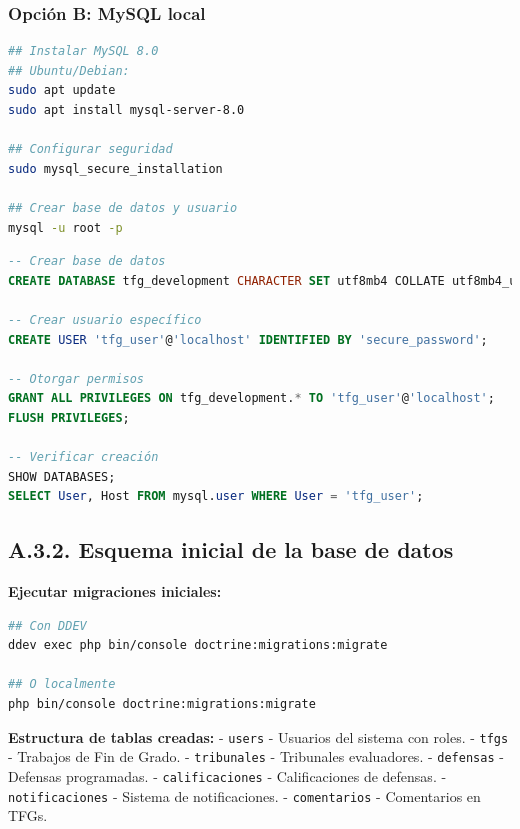 \documentclass[12pt,a4paper,oneside]{report}
\providecommand{\passthrough}[1]{\texttt{#1}}
\begin{document}
\subsubsection{Opción B: MySQL local}\label{opciuxf3n-b-mysql-local}

\begin{lstlisting}[language=bash]
## Instalar MySQL 8.0
## Ubuntu/Debian:
sudo apt update
sudo apt install mysql-server-8.0

## Configurar seguridad
sudo mysql_secure_installation

## Crear base de datos y usuario
mysql -u root -p
\end{lstlisting}

\begin{lstlisting}[language=SQL]
-- Crear base de datos
CREATE DATABASE tfg_development CHARACTER SET utf8mb4 COLLATE utf8mb4_unicode_ci;

-- Crear usuario específico
CREATE USER 'tfg_user'@'localhost' IDENTIFIED BY 'secure_password';

-- Otorgar permisos
GRANT ALL PRIVILEGES ON tfg_development.* TO 'tfg_user'@'localhost';
FLUSH PRIVILEGES;

-- Verificar creación
SHOW DATABASES;
SELECT User, Host FROM mysql.user WHERE User = 'tfg_user';
\end{lstlisting}

\subsection{A.3.2. Esquema inicial de la base de
datos}\label{a.3.2.-esquema-inicial-de-la-base-de-datos}

\textbf{Ejecutar migraciones iniciales:}

\begin{lstlisting}[language=bash]
## Con DDEV
ddev exec php bin/console doctrine:migrations:migrate

## O localmente
php bin/console doctrine:migrations:migrate
\end{lstlisting}

\textbf{Estructura de tablas creadas:} - \passthrough{\lstinline!users!}
- Usuarios del sistema con roles. - \passthrough{\lstinline!tfgs!} -
Trabajos de Fin de Grado. - \passthrough{\lstinline!tribunales!} -
Tribunales evaluadores. - \passthrough{\lstinline!defensas!} - Defensas
programadas. - \passthrough{\lstinline!calificaciones!} - Calificaciones
de defensas. - \passthrough{\lstinline!notificaciones!} - Sistema de
notificaciones. - \passthrough{\lstinline!comentarios!} - Comentarios en
TFGs.
\end{document}
